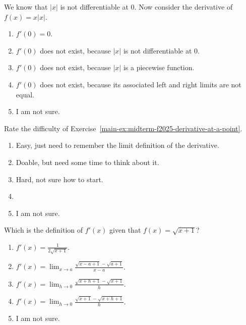 \documentclass[aspectratio=169, 14pt, t]{beamer}  %
\begin{document}
\begin{poll}
  We know that \(|x|\) is not differentiable at \(0\).  Now consider the derivative of \(f(x) = x|x|\).

  \begin{enumerate}
    \item \(f'(0) = 0\). 
    \item \(f'(0)\) does not exist, because \(|x|\) is not differentiable at \(0\).
    \item \(f'(0)\) does not exist, because \(|x|\) is a piecewise function.
    \item \(f'(0)\) does not exist, because its associated left and right limits are not equal.
    \item I am not sure.
  \end{enumerate}

  \pause
\end{poll}

\begin{poll}
  Rate the difficulty of Exercise~\ref{main-ex:midterm-f2025-derivative-at-a-point}.

  \begin{enumerate}
    \item Easy, just need to remember the limit definition of the derivative.
    \item Doable, but need some time to think about it.
    \item Hard, not sure how to start.
    \item
    \item I am not sure.
  \end{enumerate}
\end{poll}

\begin{poll}
  Which is the definition of \(f'(x)\) given that \(f(x) = \sqrt{x + 1}\)?

  \begin{enumerate}
    \item \(f'(x) = \frac{1}{2\sqrt{x + 1}}\).
    \item \(f'(x) = \lim_{x \to a} \frac{\sqrt{x - a + 1} - \sqrt{a+1}}{x - a}\).
    \item \(f'(x) = \lim_{h \to 0} \frac{\sqrt{x + h + 1} - \sqrt{x + 1}}{h}\).
    \item \(f'(x) = \lim_{h \to 0} \frac{\sqrt{x + 1} - \sqrt{x + h + 1}}{h}\).
    \item I am not sure.
  \end{enumerate}
\end{poll}
\end{document}
